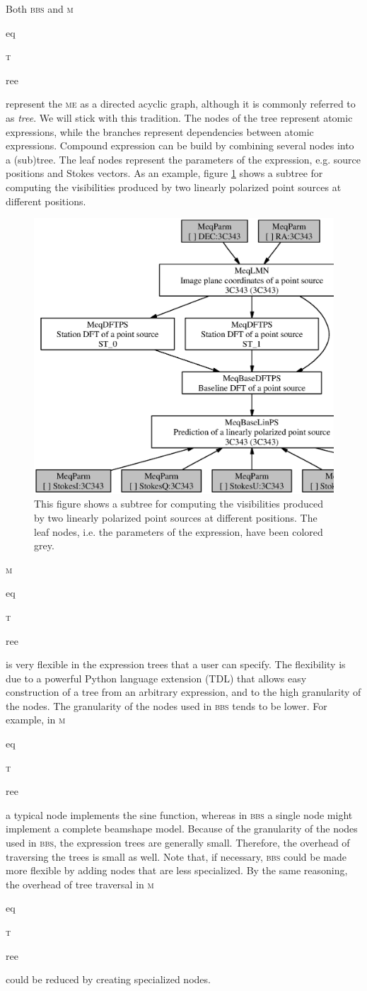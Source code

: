 \documentclass[10pt]{lofar}
\newcommand{\bbs}{\textsc{bbs}\xspace}
\newcommand{\me}{\textsc{me}\xspace}
\newcommand{\meqtree}{\textsc{m}\begin{footnotesize}eq\end{footnotesize}\textsc{t}\begin{footnotesize}ree\end{footnotesize}\xspace}
\begin{document}
Both \bbs and \meqtree represent the \me as a directed acyclic graph, although it is commonly referred to as \emph{tree}. We will stick with this tradition. The nodes of the tree represent atomic expressions, while the branches represent dependencies between atomic expressions. Compound expression can be build by combining several nodes into a (sub)tree. The leaf nodes represent the parameters of the expression, e.g. source positions and Stokes vectors. As an example, figure \ref{fig:expr_tree} shows a subtree for computing the visibilities produced by two linearly polarized point sources at different positions.

\begin{figure}[!ht]
\label{fig:expr_tree}
\centering
\includegraphics[width=\textwidth]{images/expr_graph_sdd.ps}
\caption{This figure shows a subtree for computing the visibilities produced by two linearly polarized point sources at different positions. The leaf nodes, i.e. the parameters of the expression, have been colored grey.}
\end{figure}

\meqtree is very flexible in the expression trees that a user can specify. The flexibility is due to a powerful Python language extension (\textsc{TDL}) that allows easy construction of a tree from an arbitrary expression, and to the high granularity of the nodes. The granularity of the nodes used in \bbs tends to be lower. For example, in \meqtree a typical node implements the sine function, whereas in \bbs a single node might implement a complete beamshape model. Because of the granularity of the nodes used in \bbs, the expression trees are generally small. Therefore, the overhead of traversing the trees is small as well. Note that, if necessary, \bbs could be made more flexible by adding nodes that are less specialized. By the same reasoning, the overhead of tree traversal in \meqtree could be reduced by creating specialized nodes.
\end{document}
